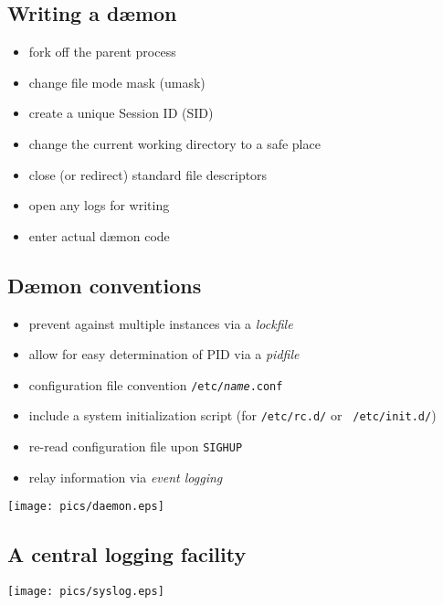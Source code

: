 \documentclass[xga]{xdvislides}
\begin{document}
\subsection{Writing a d\ae mon}
\begin{itemize}
	\item fork off the parent process
	\item change file mode mask (umask)
	\item create a unique Session ID (SID)
	\item change the current working directory to a safe place
	\item close (or redirect) standard file descriptors
	\item open any logs for writing
	\item enter actual d\ae mon code
\end{itemize}

\subsection{D\ae mon conventions}
\begin{itemize}
	\item prevent against multiple instances via a {\em lockfile}
	\item allow for easy determination of PID via a {\em pidfile}
	\item configuration file convention {\tt /etc/{\em name}.conf}
	\item include a system initialization script (for {\tt /etc/rc.d/} or {\tt
		/etc/init.d/})
	\item re-read configuration file upon {\tt SIGHUP}
	\item relay information via {\em event logging}
\end{itemize}

\vfill
\hfill\texttt{[image: pics/daemon.eps]} \\

\subsection{A central logging facility}
\begin{center}
	\texttt{[image: pics/syslog.eps]}
\end{center}
\end{document}

